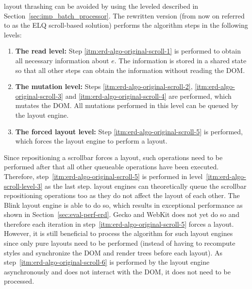 \documentclass[a4paper,11pt]{kth-mag}
\begin{document}
        \Gls{layout thrashing} can be avoided by using the leveled  described in Section~\ref{sec:imp_batch_processor}.
        The rewritten version (from now on referred to as the \gls{ELQ} scroll-based solution) performs the algorithm steps in the following levels:
        \begin{enumerate}
          \item\label{itm:erd-algo-scroll-level-1}
            \textbf{The read level:}
            Step \ref{itm:erd-algo-original-scroll-1} is performed to obtain all necessary information about $e$.
            The information is stored in a shared state so that all other steps can obtain the information without reading the \gls{DOM}.
          \item\label{itm:erd-algo-scroll-level-2}
            \textbf{The mutation level:}
            Steps \ref{itm:erd-algo-original-scroll-2}, \ref{itm:erd-algo-original-scroll-3} and \ref{itm:erd-algo-original-scroll-4} are performed, which mutates the \gls{DOM}.
            All mutations performed in this level can be queued by the \gls{layout engine}.
          \item\label{itm:erd-algo-scroll-level-3}
            \textbf{The forced layout level:}
            Step \ref{itm:erd-algo-original-scroll-5} is performed, which forces the \gls{layout engine} to perform a layout.
        \end{enumerate}
        Since repositioning a scrollbar forces a layout, such operations need to be performed after that all other queueable operations have been executed.
        Therefore, step~\ref{itm:erd-algo-original-scroll-5} is performed in level~\ref{itm:erd-algo-scroll-level-3} as the last step.
        \Glspl{layout engine} can theoretically queue the scrollbar repositioning operations too as they do not affect the layout of each other.
        The \gls{Blink} \gls{layout engine} is able to do so, which results in exceptional performance as shown in Section~\ref{sec:eval-perf-erd}.
        \gls{Gecko} and \gls{WebKit} does not yet do so and therefore each iteration in step~\ref{itm:erd-algo-original-scroll-5} forces a layout.
        However, it is still beneficial to  process the algorithm for such \glspl{layout engine} since only pure layouts need to be performed (instead of having to recompute styles and synchronize the \gls{DOM} and \glspl{render tree} before each layout).        
        As step~\ref{itm:erd-algo-original-scroll-6} is performed by the \gls{layout engine} asynchronously and does not interact with the \gls{DOM}, it does not need to be  processed.
\end{document}
